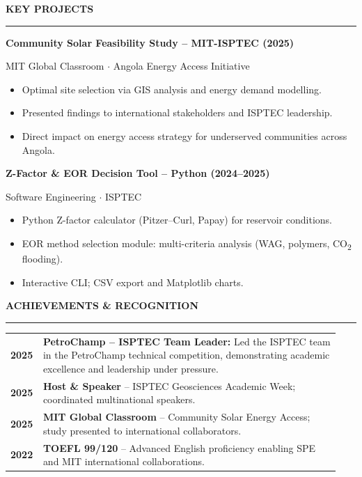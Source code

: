\documentclass[10pt,a4paper]{article}
\newcommand{\mainSection}[1]{%
  \vspace{4pt}%
  {\bfseries\color{navy}\large\MakeUppercase{#1}}%
  \par\vspace{0pt}%
  {\color{navy}\rule{\linewidth}{1.0pt}}%
  \par\vspace{2pt}%
}
\begin{document}
\begin{minipage}[t]{\dimexpr 0.705\paperwidth - 26pt}
  \mainSection{Key Projects}

  {\small\bfseries\color{navy}Community Solar Feasibility Study -- MIT-ISPTEC (2025)}\par
  {\footnotesize\color{mutedtext}MIT Global Classroom $\cdot$ Angola Energy Access Initiative}
  \begin{itemize}
    \item Optimal site selection via GIS analysis and energy demand modelling.
    \item Presented findings to international stakeholders and ISPTEC leadership.
    \item Direct impact on energy access strategy for underserved communities across Angola.
  \end{itemize}

  \vspace{3pt}
  {\small\bfseries\color{navy}Z-Factor \& EOR Decision Tool -- Python (2024--2025)}\par
  {\footnotesize\color{mutedtext}Software Engineering $\cdot$ ISPTEC}
  \begin{itemize}
    \item Python Z-factor calculator (Pitzer--Curl, Papay) for reservoir conditions.
    \item EOR method selection module: multi-criteria analysis (WAG, polymers,
          CO\textsubscript{2} flooding).
    \item Interactive CLI; CSV export and Matplotlib charts.
  \end{itemize}

  \mainSection{Achievements \& Recognition}

  \renewcommand{\arraystretch}{1.40}
  \begin{tabular}{@{} p{0.06\linewidth} p{0.88\linewidth} @{}}
    {\footnotesize\bfseries\color{navy}2025} &
      \textbf{PetroChamp -- ISPTEC Team Leader:} Led the ISPTEC team in the
      PetroChamp technical competition, demonstrating academic excellence and
      leadership under pressure.\\
    {\footnotesize\bfseries\color{navy}2025} &
      \textbf{Host \& Speaker} -- ISPTEC Geosciences Academic Week;
      coordinated multinational speakers.\\
    {\footnotesize\bfseries\color{navy}2025} &
      \textbf{MIT Global Classroom} -- Community Solar Energy Access; study
      presented to international collaborators.\\
    {\footnotesize\bfseries\color{navy}2022} &
      \textbf{TOEFL 99/120} -- Advanced English proficiency enabling SPE
      and MIT international collaborations.\\
  \end{tabular}
  \renewcommand{\arraystretch}{1}


\end{minipage}
\end{document}
